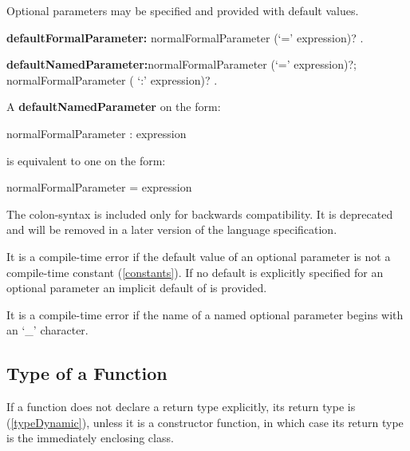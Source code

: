 \documentclass{article}
\begin{document}
\LMHash{}
Optional parameters may be specified and provided with default values.

\begin{grammar}
{\bf defaultFormalParameter:}
      normalFormalParameter (`=' expression)?
    .

{\bf defaultNamedParameter:}normalFormalParameter (`=' expression)?;
      normalFormalParameter ( `{\escapegrammar :}' expression)?
    .
\end{grammar}

A {\bf defaultNamedParameter} on the form:
\begin{code}
   normalFormalParameter : expression
\end{code}
is equivalent to one on the form:
\begin{code}
   normalFormalParameter = expression
\end{code}
The colon-syntax is included only for backwards compatibility.
It is deprecated and will be removed in a later version of the language specification.

\LMHash{}
It is a compile-time error if the default value of an optional parameter is not a compile-time constant (\ref{constants}). If no default is explicitly specified for an optional parameter an implicit default of \NULL{} is provided.

\LMHash{}
It is a compile-time error if the name of a named optional parameter begins with an `\_' character.


\subsection{Type of a Function}

\LMHash{}
If a function does not declare a return type explicitly, its return type is \DYNAMIC{} (\ref{typeDynamic}), unless it is a constructor function, in which case its return type is the immediately enclosing class.
\end{document}

